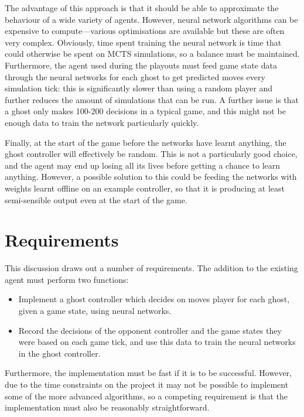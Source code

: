 The advantage of this approach is that it should be able to approximate the behaviour of a wide variety of agents.  However, neural network algorithms can be expensive to compute---various optimisations are available but these are often very complex.  Obviously, time spent training the neural network is time that could otherwise be spent on MCTS simulations, so a balance must be maintained.  Furthermore, the agent used during the playouts must feed game state data through the neural networks for each ghost to get predicted moves every simulation tick: this is significantly slower than using a random player and further reduces the amount of simulations that can be run.  A further issue is that a ghost only makes 100-200 decisions in a typical game, and this might not be enough data to train the network particularly quickly.

Finally, at the start of the game before the networks have learnt anything, the ghost controller will effectively be random.  This is not a particularly good choice, and the agent may end up losing all its lives before getting a chance to learn anything.  However, a possible solution to this could be feeding the networks with weights learnt offline on an example controller, so that it is producing at least semi-sensible output even at the start of the game.

\section{Requirements}

This discussion draws out a number of requirements.  The addition to the existing agent must perform two functions:

\begin{itemize}
\item Implement a ghost controller which decides on moves player for each ghost, given a game state, using neural networks.
\item Record the decisions of the opponent controller and the game states they were based on each game tick, and use this data to train the neural networks in the ghost controller.
\end{itemize}

Furthermore, the implementation must be fast if it is to be successful.  However, due to the time constraints on the project it may not be possible to implement some of the more advanced algorithms, so a competing requirement is that the implementation must also be reasonably straightforward.

